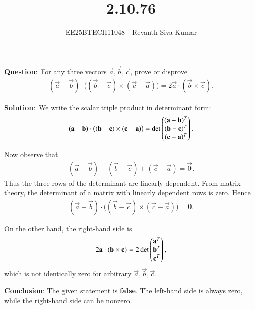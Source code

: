 \documentclass[journal]{IEEEtran}
\begin{document}

\vspace{3cm}

\title{2.10.76}
\author{EE25BTECH11048 - Revanth Siva Kumar}
{\let\newpage\relax\maketitle}

\textbf{Question}:\
For any three vectors $\vec{a},\vec{b},\vec{c}$, prove or disprove
\begin{align*}
    (\vec{a}-\vec{b})\cdot \big((\vec{b}-\vec{c})\times(\vec{c}-\vec{a})\big) = 2\vec{a}\cdot(\vec{b}\times \vec{c}).
\end{align*}



\textbf{Solution}:\
We write the scalar triple product in determinant form:
\begin{align}
(\mathbf{a}-\mathbf{b})\cdot \big((\mathbf{b}-\mathbf{c})\times(\mathbf{c}-\mathbf{a})\big)
= \det\begin{pmatrix} (\mathbf{a}-\mathbf{b})^T \\ (\mathbf{b}-\mathbf{c})^T \\ (\mathbf{c}-\mathbf{a})^T \end{pmatrix}.
\end{align}

Now observe that
\begin{align}
(\vec{a}-\vec{b}) + (\vec{b}-\vec{c}) + (\vec{c}-\vec{a}) = \vec{0}.
\end{align}
Thus the three rows of the determinant are linearly dependent. From matrix theory, the determinant of a matrix with linearly dependent rows is zero. Hence
\begin{align}
(\vec{a}-\vec{b})\cdot \big((\vec{b}-\vec{c})\times(\vec{c}-\vec{a})\big) = 0.
\end{align}

On the other hand, the right-hand side is
\begin{align}
2\mathbf{a}\cdot(\mathbf{b}\times\mathbf{c})
= 2\det\begin{pmatrix}\mathbf{a}^T \\ \mathbf{b}^T \\ \mathbf{c}^T\end{pmatrix},
\end{align}
which is not identically zero for arbitrary $\vec{a},\vec{b},\vec{c}$.

\textbf{Conclusion}: The given statement is \textbf{false}. The left-hand side is always zero, while the right-hand side can be nonzero.
\end{document}
